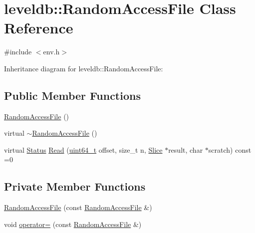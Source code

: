 \hypertarget{classleveldb_1_1_random_access_file}{\section{leveldb\-:\-:Random\-Access\-File Class Reference}
\label{classleveldb_1_1_random_access_file}
}


{\ttfamily \#include $<$env.\-h$>$}



Inheritance diagram for leveldb\-:\-:Random\-Access\-File\-:
\subsection*{Public Member Functions}
\begin{DoxyCompactItemize}
\item 
\hyperlink{classleveldb_1_1_random_access_file_af5112c2ca05fe2fa79ef5ca868164ff7}{Random\-Access\-File} ()
\item 
virtual \hyperlink{classleveldb_1_1_random_access_file_af8557f9315f6924af0bd3f0cb38474f4}{$\sim$\-Random\-Access\-File} ()
\item 
virtual \hyperlink{classleveldb_1_1_status}{Status} \hyperlink{classleveldb_1_1_random_access_file_a1a09fadcec904d9791a968acabca98d0}{Read} (\hyperlink{stdint_8h_aaa5d1cd013383c889537491c3cfd9aad}{uint64\-\_\-t} offset, size\-\_\-t n, \hyperlink{classleveldb_1_1_slice}{Slice} $\ast$result, char $\ast$scratch) const =0
\end{DoxyCompactItemize}
\subsection*{Private Member Functions}
\begin{DoxyCompactItemize}
\item 
\hyperlink{classleveldb_1_1_random_access_file_afa0aa5cef8c82310b5fa3c91fe311d66}{Random\-Access\-File} (const \hyperlink{classleveldb_1_1_random_access_file}{Random\-Access\-File} \&)
\item 
void \hyperlink{classleveldb_1_1_random_access_file_ac1b05d6fb2984c7cc590d1c96c935aca}{operator=} (const \hyperlink{classleveldb_1_1_random_access_file}{Random\-Access\-File} \&)
\end{DoxyCompactItemize}


